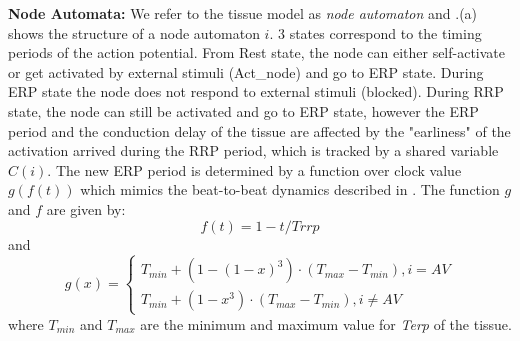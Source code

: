 \textbf{Node Automata:} We refer to the tissue model as \emph{node automaton} and .(a) shows the structure of a node automaton $i$. 3 states correspond to the timing periods of the action potential. From \textsf{Rest} state, the node can either self-activate or get activated by external stimuli (Act\_node) and go to \textsf{ERP} state. During \textsf{ERP} state the node does not respond to external stimuli (blocked). During \textsf{RRP} state, the node can still be activated and go to \textsf{ERP} state, however the ERP period and the conduction delay of the tissue are affected by the "earliness" of the activation arrived during the RRP period, which is tracked by a shared variable $C(i)$. The new ERP period is determined by a function over clock value $g(f(t))$ which mimics the beat-to-beat dynamics described in \cite{josephson}. The function $g$ and $f$ are given by:
\begin{equation} \label{factor}
						f(t) = 1-t/Trrp
						\end{equation}
and
\begin{equation} \label{earliness_noAV}
						g(x) = \left\{
						\begin{array}{lr}
						
						T_{min}+(1-(1-x)^3)\cdot (T_{max}-T_{min}), i=AV\\
						T_{min}+(1-x^3)\cdot (T_{max}-T_{min}),i\neq AV
			
						
						\end{array}
						\right.
						\end{equation}  
where $T_{min}$ and $T_{max}$ are the minimum and maximum value for \emph{Terp} of the tissue.
